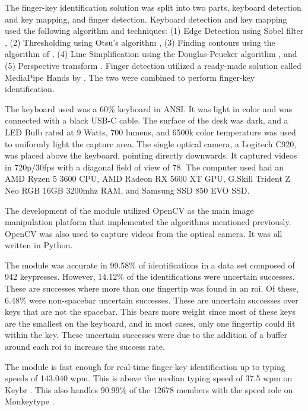\documentclass{report}
\begin{document}
The finger-key identification solution was split into two parts, keyboard
detection and key mapping, and finger detection. Keyboard detection and key
mapping used the following algorithm and techniques: (1) Edge Detection using
Sobel filter \parencite{sobel2014}, (2) Thresholding using Otsu's algorithm
\parencite{otsu}, (3) Finding contours using the algorithm of
\textcite{contours}, (4) Line Simplification using the Douglas-Peucker algorithm
\parencite{douglas-peucker}, and (5) Perspective transform
\parencite{opencv-image-transform}. Finger detection utilized a ready-made
solution called MediaPipe Hands by \textcite{mediapipe}. The two were combined
to perform finger-key identification.

The keyboard used was a 60\% keyboard in ANSI. It was light in color and was
connected with a black USB-C cable. The surface of the desk was dark, and a LED
Bulb rated at 9 Watts, 700 lumens, and 6500k color temperature was used to
uniformly light the capture area. The single optical camera, a Logitech C920,
was placed above the keyboard, pointing directly downwards. It captured videos
in 720p/30fps with a diagonal field of view of 78\degree \parencite{logitech}.
The computer used had an AMD Ryzen 5 3600 CPU, AMD Radeon RX 5600 XT GPU,
G.Skill Trident Z Neo RGB 16GB 3200mhz RAM, and Samsung SSD 850 EVO SSD.

The development of the module utilized OpenCV as the main image manipulation
platform that implemented the algorithms mentioned previously. OpenCV was also
used to capture videos from the optical camera. It was all written in Python.

The module was accurate in 99.58\% of identifications in a data set composed of
942 keypresses. However, 14.12\% of the identifications were uncertain
successes. These are successes where more than one fingertip was found in an
\ac{roi}. Of these, 6.48\% were non-spacebar uncertain successes. These are
uncertain successes over keys that are not the spacebar. This bears more weight
since most of these keys are the smallest on the keyboard, and in most cases,
only one fingertip could fit within the key. These uncertain successes were due
to the addition of a buffer around each \ac{roi} to increase the success rate.

The module is fast enough for real-time finger-key identification up to typing
speeds of 143.040 \ac{wpm}. This is above the median typing speed of 37.5
\ac{wpm} on Keybr \parencite{keybr}. This also handles 90.99\% of the 12678
members with the speed role on Monkeytype \parencite{monkey-stats}.
\end{document}
